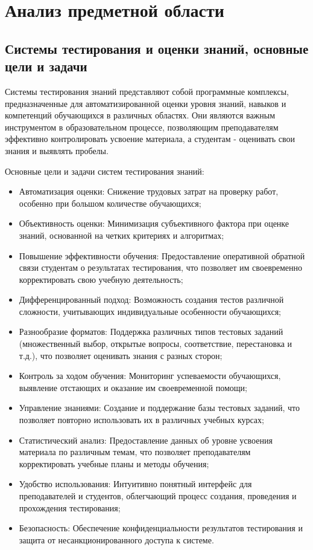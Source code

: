 \section{Анализ предметной области}
\subsection{Системы тестирования и оценки знаний, основные цели и задачи}

Системы тестирования знаний представляют собой программные комплексы, предназначенные для автоматизированной оценки уровня знаний, навыков и компетенций обучающихся в различных областях. Они являются важным инструментом в образовательном процессе, позволяющим преподавателям эффективно контролировать усвоение материала, а студентам - оценивать свои знания и выявлять пробелы.

Основные цели и задачи систем тестирования знаний:
\begin{itemize}
	\item Автоматизация оценки: Снижение трудовых затрат на проверку работ, особенно при большом количестве обучающихся;
	\item Объективность оценки: Минимизация субъективного фактора при оценке знаний, основанной на четких критериях и алгоритмах;
	\item Повышение эффективности обучения: Предоставление оперативной обратной связи студентам о результатах тестирования, что позволяет им своевременно корректировать свою учебную деятельность;
	\item Дифференцированный подход: Возможность создания тестов различной сложности, учитывающих индивидуальные особенности обучающихся;
	\item Разнообразие форматов: Поддержка различных типов тестовых заданий (множественный выбор, открытые вопросы, соответствие, перестановка и т.д.), что позволяет оценивать знания с разных сторон;
	\item Контроль за ходом обучения: Мониторинг успеваемости обучающихся, выявление отстающих и оказание им своевременной помощи;
	\item Управление знаниями: Создание и поддержание базы тестовых заданий, что позволяет повторно использовать их в различных учебных курсах;
	\item Статистический анализ: Предоставление данных об уровне усвоения материала по различным темам, что позволяет преподавателям корректировать учебные планы и методы обучения;
	\item Удобство использования: Интуитивно понятный интерфейс для преподавателей и студентов, облегчающий процесс создания, проведения и прохождения тестирования;
	\item Безопасность: Обеспечение конфиденциальности результатов тестирования и защита от несанкционированного доступа к системе.
\end{itemize}

